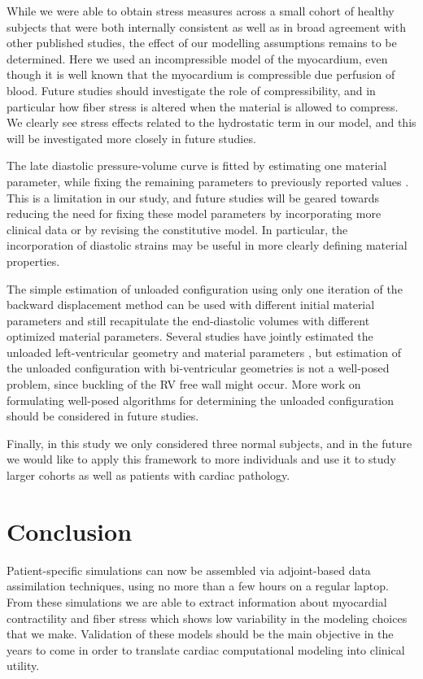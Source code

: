 While we were able to obtain stress measures across a small cohort of healthy subjects that were
both internally consistent as well as in broad agreement with other
published studies, the effect of our modelling assumptions remains to
be determined.  Here we used an incompressible model of the
myocardium, even though it is well known that the myocardium is 
compressible due perfusion of blood. Future studies should investigate
the role of compressibility, and in particular how fiber stress is
altered when the material is allowed to compress. We clearly see stress effects
related to the hydrostatic term in our model, and this will be
investigated more closely in future studies.

The late diastolic pressure-volume curve is fitted by estimating one
material parameter, while fixing the remaining parameters to previously
reported values \citep{asner2015estimation}. This is a limitation in our
study, and future studies will be geared towards reducing the need for fixing
these model parameters by incorporating more clinical data or by
revising the constitutive model.  In particular, the incorporation of
diastolic strains may be useful in more clearly defining material properties.

The simple estimation of unloaded configuration using only
one iteration of the backward displacement method can be used with
different initial material parameters and still recapitulate the
end-diastolic volumes with different optimized material parameters.
Several studies have jointly estimated
the unloaded left-ventricular geometry and material parameters
\citep{nikou2016effects, finsberg2017estimating, asner2015estimation},
but estimation of the unloaded configuration with
bi-ventricular geometries is not a well-posed problem, since buckling of
the RV free wall might occur. More work on formulating well-posed
algorithms for determining the unloaded configuration should be
considered in future studies.

Finally, in this study we only considered three normal
subjects, and in the future we would like to apply this framework to more
individuals and use it to study larger cohorts as well as patients with
cardiac pathology.


\section{Conclusion}
\label{paper3:sec:concl} 
Patient-specific simulations can now be assembled via adjoint-based
data assimilation techniques, using no more than a few hours on a
regular laptop. From these simulations we are able to extract
information about myocardial contractility and fiber stress which
shows low variability in the modeling choices that we make. Validation of
these models should be the main objective in the years to come in
order to translate cardiac computational modeling into clinical utility.


